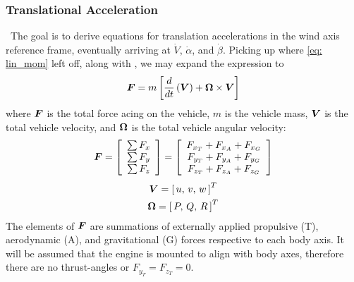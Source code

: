 \documentclass[12pt]{ucthesis}
\begin{document}
\subsubsection{Translational Acceleration} $\,$
\label{subsubsec: trans}
%
The goal is to derive equations for translation accelerations in the wind axis reference frame, eventually arriving at $\dot{V}$, $\dot{\alpha}$, and $\dot{\beta}$. Picking up where \autoref{eq: lin_mom} left off, along with , we may expand the expression to
%
	\begin{equation}
		\boldsymbol{F} = m \left[ \frac{d}{dt} \left( \boldsymbol{V} \right) + \boldsymbol{\Omega} \times \boldsymbol{V} \right]
		\label{eq: lin_mom_nasa}
	\end{equation}%
%
where $\boldsymbol{F}$ is the total force acing on the vehicle, $m$ is the vehicle mass, $\boldsymbol{V}$ is the total vehicle velocity, and $\boldsymbol{\Omega}$ is the total vehicle angular velocity:
%
	\begin{equation}
		\boldsymbol{F} 		= \textstyle \left[ \begin{array}{c} \sum F_{x} \\ \sum F_{y} \\ \sum F_{z} \end{array}\right]= \left[ \begin{array}{c} 
		F_{x_{T}} + F_{x_{A}} + F_{x_{G}}\\
		F_{y_{T}} + F_{y_{A}} + F_{y_{G}}\\
		F_{z_{T}} + F_{z_{A}} + F_{z_{G}}
		\end{array}\right]
		\label{eq: lin_mom_F}
	\end{equation}%
%
	\begin{gather} %
		\vect{V} 		= \left[\,u,\,v,\,w\,\right]^T \label{eq: lin_mom_V} \\
		\vect{\Omega} 	= \left[\,P,\,Q,\,R\,\right]^T \label{eq: lin_mom_O}
	\end{gather}
%
The elements of $\boldsymbol{F}$ are summations of externally applied propulsive (T), aerodynamic (A), and gravitational (G) forces respective to each body axis. It will be assumed that the engine is mounted to align with body axes, therefore there are no thrust-angles or $F_{y_{T}} = F_{z_{T}} = 0$. 
\end{document}
